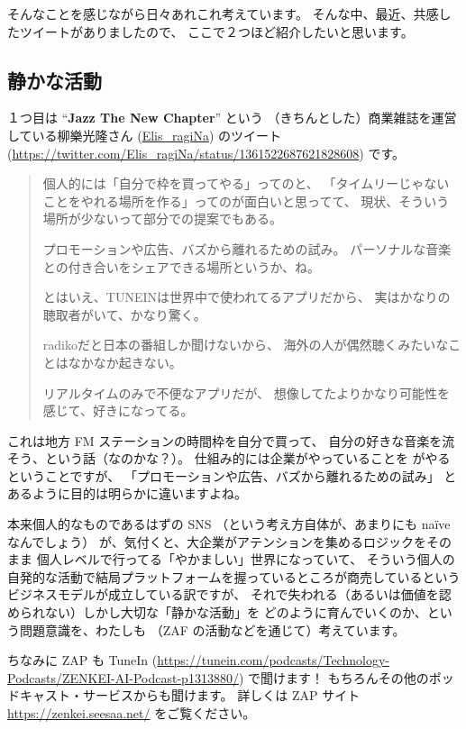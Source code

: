 \documentclass[dvipdfmx,autodetect-engine,10pt,b5paper,papersize,openany,dvipsnames]{jsbook}
\begin{document}
\begin{multicols}{2}
そんなことを感じながら日々あれこれ考えています。
そんな中、最近、共感したツイートがありましたので、
ここで２つほど紹介したいと思います。

\subsection{静かな活動}
１つ目は
``{\bfseries Jazz The New Chapter}'' という
（きちんとした）商業雑誌を運営している柳樂光隆さん
(\href{https://twitter.com/Elis_ragiNa/}{Elis\_ragiNa})
のツイート
(\url{https://twitter.com/Elis_ragiNa/status/1361522687621828608})
です。
\begin{quotation}
  \noindent
  個人的には「自分で枠を買ってやる」ってのと、
  「タイムリーじゃないことをやれる場所を作る」ってのが面白いと思ってて、
  現状、そういう場所が少ないって部分での提案でもある。

  プロモーションや広告、バズから離れるための試み。
  パーソナルな音楽との付き合いをシェアできる場所というか、ね。

  とはいえ、TUNEINは世界中で使われてるアプリだから、
  実はかなりの聴取者がいて、かなり驚く。

  radikoだと日本の番組しか聞けないから、
  海外の人が偶然聴くみたいなことはなかなか起きない。

  リアルタイムのみで不便なアプリだが、
  想像してたよりかなり可能性を感じて、好きになってる。
\end{quotation}
これは地方 FM ステーションの時間枠を自分で買って、
自分の好きな音楽を流そう、という話（なのかな？）。
仕組み的には企業がやっていることを
がやるということですが、
「プロモーションや広告、バズから離れるための試み」
とあるように目的は明らかに違いますよね。

本来個人的なものであるはずの SNS
（という考え方自体が、あまりにも na\"{i}ve なんでしょう）
が、気付くと、大企業がアテンションを集めるロジックをそのまま
個人レベルで行ってる「やかましい」世界になっていて、
そういう個人の自発的な活動で結局プラットフォームを握っているところが商売しているという
ビジネスモデルが成立している訳ですが、
それで失われる（あるいは価値を認められない）しかし大切な「静かな活動」を
どのように育んでいくのか、という問題意識を、わたしも
（ZAF の活動などを通じて）考えています。
	  
ちなみに ZAP も TuneIn
(\url{https://tunein.com/podcasts/Technology-Podcasts/ZENKEI-AI-Podcast-p1313880/}) で聞けます！
もちろんその他のポッドキャスト・サービスからも聞けます。
詳しくは ZAP サイト \url{https://zenkei.seesaa.net/} をご覧ください。



\end{multicols}
\end{document}

